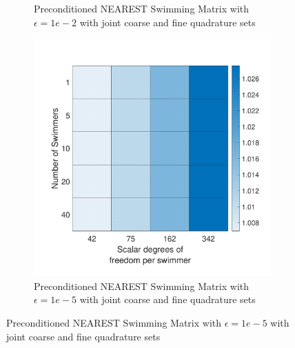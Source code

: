\begin{figure}
\begin{subfigure}{0.3\textwidth}
        \caption{Preconditioned NEAREST Swimming Matrix with $\epsilon=1e-2$ with joint coarse and fine quadrature sets}  
    \end{subfigure}
    \begin{subfigure}{0.3\textwidth}
        \includegraphics[width=\linewidth]{Images/Condition/Mobility Matrix using Contained NEAREST Preconditioned-5.pdf}
        \caption{Preconditioned NEAREST Swimming Matrix with $\epsilon=1e-5$ with joint coarse and fine quadrature sets}  
    \end{subfigure}
\end{figure}


